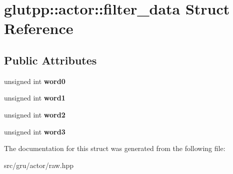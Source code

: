 \hypertarget{structglutpp_1_1actor_1_1filter__data}{\section{glutpp\-:\-:actor\-:\-:filter\-\_\-data \-Struct \-Reference}
\label{structglutpp_1_1actor_1_1filter__data}
}
\subsection*{\-Public \-Attributes}
\begin{DoxyCompactItemize}
\item 
\hypertarget{structglutpp_1_1actor_1_1filter__data_a850abae89cdf5b5bcff1d0cc3b7f1219}{unsigned int {\bfseries word0}}\label{structglutpp_1_1actor_1_1filter__data_a850abae89cdf5b5bcff1d0cc3b7f1219}

\item 
\hypertarget{structglutpp_1_1actor_1_1filter__data_aa89479116aa955ea140728debaf074f2}{unsigned int {\bfseries word1}}\label{structglutpp_1_1actor_1_1filter__data_aa89479116aa955ea140728debaf074f2}

\item 
\hypertarget{structglutpp_1_1actor_1_1filter__data_a6e522c6a5fec0a668b655611d305221e}{unsigned int {\bfseries word2}}\label{structglutpp_1_1actor_1_1filter__data_a6e522c6a5fec0a668b655611d305221e}

\item 
\hypertarget{structglutpp_1_1actor_1_1filter__data_a496ab991fcdea69d02b4a38fadd40870}{unsigned int {\bfseries word3}}\label{structglutpp_1_1actor_1_1filter__data_a496ab991fcdea69d02b4a38fadd40870}

\end{DoxyCompactItemize}


\-The documentation for this struct was generated from the following file\-:\begin{DoxyCompactItemize}
\item 
src/gru/actor/raw.\-hpp\end{DoxyCompactItemize}

